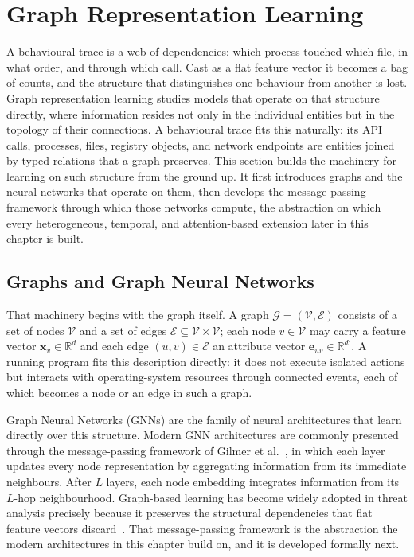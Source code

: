 \documentclass[%
    BCOR=10mm,
    DIV=13,
    toc=bibliography,
    toc=listof,
    oneside,
    12pt,
]{scrbook}
\begin{document}
\section{Graph Representation Learning}
\label{sec:graph_rl}

A behavioural trace is a web of dependencies: which process touched which file, in
what order, and through which call. Cast as a flat feature vector it becomes a bag
of counts, and the structure that distinguishes one behaviour from another is
lost. Graph representation learning studies models that operate on that structure
directly, where information resides not only in the individual entities but in the
topology of their connections. A behavioural trace fits this naturally: its API
calls, processes, files, registry objects, and network endpoints are entities
joined by typed relations that a graph preserves. This
section builds the machinery for learning on such structure from the ground up.
It first introduces graphs and the neural networks that operate on them, then
develops the message-passing framework through which those networks compute, the
abstraction on which every heterogeneous, temporal, and attention-based extension
later in this chapter is built.

\subsection{Graphs and Graph Neural Networks}
\label{subsec:gnn_general}

That machinery begins with the graph itself. A graph
$\mathcal{G} = (\mathcal{V}, \mathcal{E})$ consists of a set of nodes
$\mathcal{V}$ and a set of edges $\mathcal{E} \subseteq \mathcal{V} \times
\mathcal{V}$; each node $v \in \mathcal{V}$ may carry a feature vector
$\mathbf{x}_v \in \mathbb{R}^d$ and each edge $(u, v) \in \mathcal{E}$ an
attribute vector $\mathbf{e}_{uv} \in \mathbb{R}^{d'}$. A running program fits this
description directly: it does not execute isolated actions but interacts with
operating-system resources through connected events, each of which becomes a node
or an edge in such a graph.

Graph Neural Networks (GNNs) are the family of neural architectures that learn
directly over this structure. Modern GNN architectures are commonly presented
through the message-passing framework of Gilmer et
al.~\cite{gilmer2017mpnn}, in which each layer updates every node
representation by aggregating information from its immediate neighbours. After
$L$ layers, each node embedding integrates information from its $L$-hop
neighbourhood. Graph-based learning has become widely adopted in threat
analysis precisely because it preserves the structural dependencies that flat
feature vectors discard~\cite{bilot2024survey, bilot2023intrusion}. That
message-passing framework is the abstraction the modern architectures in this
chapter build on, and it is developed formally next.
\end{document}
